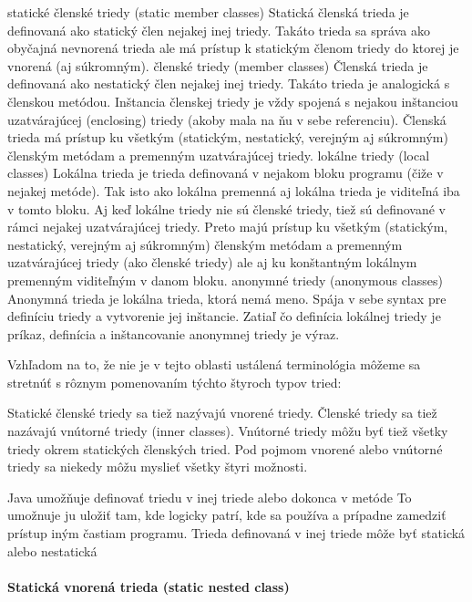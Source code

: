 statické členské triedy (static member classes)
Statická členská trieda je definovaná ako statický člen nejakej inej triedy. Takáto trieda sa správa ako obyčajná nevnorená trieda ale má prístup k statickým členom triedy do ktorej je vnorená (aj súkromným).
členské triedy (member classes)
Členská trieda je definovaná ako nestatický člen nejakej inej triedy. Takáto trieda je analogická s členskou metódou. Inštancia členskej triedy je vždy spojená s nejakou inštanciou uzatvárajúcej (enclosing) triedy (akoby mala na ňu v sebe referenciu). Členská trieda má prístup ku všetkým (statickým, nestatický, verejným aj súkromným) členským metódam a premenným uzatvárajúcej triedy.
lokálne triedy (local classes)
Lokálna trieda je trieda definovaná v nejakom bloku programu (čiže v nejakej metóde). Tak isto ako lokálna premenná aj lokálna trieda je viditeľná iba v tomto bloku. Aj keď lokálne triedy nie sú členské triedy, tiež sú definované v rámci nejakej uzatvárajúcej triedy. Preto majú prístup ku všetkým (statickým, nestatický, verejným aj súkromným) členským metódam a premenným uzatvárajúcej triedy (ako členské triedy) ale aj ku konštantným lokálnym premenným viditeľným v danom bloku.
anonymné triedy (anonymous classes)
Anonymná trieda je lokálna trieda, ktorá nemá meno. Spája v sebe syntax pre definíciu triedy a vytvorenie jej inštancie. Zatiaľ čo definícia lokálnej triedy je príkaz, definícia a inštancovanie anonymnej triedy je výraz.


Vzhľadom na to, že nie je v tejto oblasti ustálená terminológia môžeme sa stretnúť s rôznym pomenovaním týchto štyroch typov tried:

Statické členské triedy sa tiež nazývajú vnorené triedy.
Členské triedy sa tiež nazávajú vnútorné triedy (inner classes).
Vnútorné triedy môžu byť tiež všetky triedy okrem statických členských tried.
Pod pojmom vnorené alebo vnútorné triedy sa niekedy môžu myslieť všetky štyri možnosti.





		Java umožňuje definovať triedu v inej triede alebo dokonca v metóde
		To umožnuje ju uložiť tam, kde logicky patrí, kde sa používa a prípadne zamedziť prístup iným častiam programu.
		Trieda definovaná v inej triede môže byť statická alebo nestatická
		

		\paragraph{Statická vnorená trieda (static nested class)}


